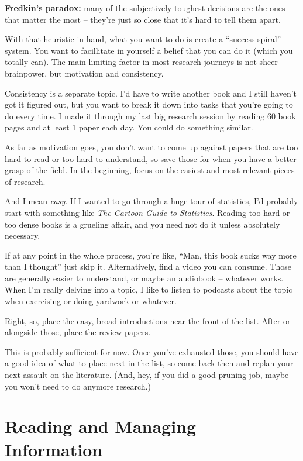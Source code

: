 \textbf{Fredkin's paradox:} many of the subjectively toughest decisions are the ones that
matter the most -- they're just so close that it's hard to tell them apart. 

With that heuristic in hand, what you want to do is create a ``success spiral''
system. You want to facillitate in yourself a belief that you can do it (which
you totally can). The main limiting factor in most research journeys is not
sheer brainpower, but motivation and consistency.

Consistency is a separate topic. I'd have to write another book and I still
haven't got it figured out, but you want to break it down into tasks that you're
going to do every time. I made it through my last big research session by
reading 60 book pages and at least 1 paper each day. You could do something similar.

As far as motivation goes, you don't want to come up against
papers that are too hard to read or too hard to understand, so save those for
when you have a better grasp of the field. In the beginning, focus on the
easiest and most relevant pieces of research.

And I mean \textit{easy}. If I wanted to go through a huge tour of statistics,
I'd probably start with something like \textit{The Cartoon Guide to
  Statistics}. Reading too hard or too dense books is a grueling affair, and you
need not do it unless absolutely necessary.

If at any point in the whole process, you're like, ``Man, this book sucks way
more than I thought'' just skip it. Alternatively, find a video you can
consume. Those are generally easier to understand, or maybe an audiobook -- whatever works. When I'm really delving into a topic, I
like to listen to podcasts about the topic when exercising or doing yardwork or whatever.


Right, so, place the easy, broad introductions near the front of the list. After
or alongside those, place the review papers.

This is probably sufficient for now. Once you've exhausted those, you should
have a good idea of what to place next in the list, so come back then and replan
your next assault on the literature. (And, hey, if you did a good pruning job,
maybe you won't need to do anymore research.)

\section{Reading and Managing Information}

